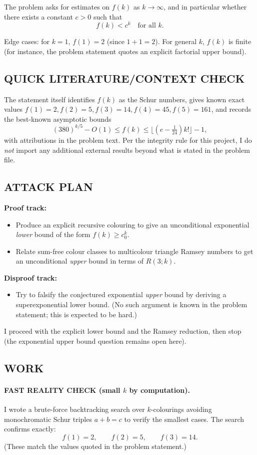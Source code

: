 The problem asks for estimates on $f(k)$ as $k\to\infty$, and in particular whether there exists a constant $c>0$ such that
\[f(k) < c^k\quad\text{for all }k.\]

Edge cases: for $k=1$, $f(1)=2$ (since $1+1=2$). For general $k$, $f(k)$ is finite (for instance, the problem statement quotes an explicit factorial upper bound).

\subsection*{QUICK LITERATURE/CONTEXT CHECK}
The statement itself identifies $f(k)$ as the Schur numbers, gives known exact values $f(1)=2,f(2)=5,f(3)=14,f(4)=45,f(5)=161$, and records the best-known asymptotic bounds
\[(380)^{k/5}-O(1)\le f(k)\le \lfloor (e-\tfrac{1}{24})k!\rfloor-1,\]
with attributions in the problem text. Per the integrity rule for this project, I do \emph{not} import any additional external results beyond what is stated in the problem file.

\subsection*{ATTACK PLAN}
\textbf{Proof track:}
\begin{itemize}
\item Produce an explicit recursive colouring to give an unconditional exponential \emph{lower} bound of the form $f(k)\ge c_0^k$.
\item Relate sum-free colour classes to multicolour triangle Ramsey numbers to get an unconditional \emph{upper} bound in terms of $R(3;k)$.
\end{itemize}
\textbf{Disproof track:}
\begin{itemize}
\item Try to falsify the conjectured exponential \emph{upper} bound by deriving a superexponential lower bound. (No such argument is known in the problem statement; this is expected to be hard.)
\end{itemize}
I proceed with the explicit lower bound and the Ramsey reduction, then stop (the exponential upper bound question remains open here).

\subsection*{WORK}
\paragraph{FAST REALITY CHECK (small $k$ by computation).}
I wrote a brute-force backtracking search over $k$-colourings avoiding monochromatic Schur triples $a+b=c$ to verify the smallest cases.
The search confirms exactly:
\[
 f(1)=2,\qquad f(2)=5,\qquad f(3)=14.
\]
(These match the values quoted in the problem statement.)

